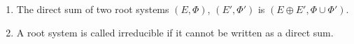 \begin{enumerate}[label=(\alph*)]
	\item The direct sum of two root systems $(E, \Phi)$, $(E', \Phi')$ is
$(E\oplus E', \Phi \cup \Phi')$.
\item A root system is called irreducible if it cannot be written as a direct sum.
\end{enumerate}
